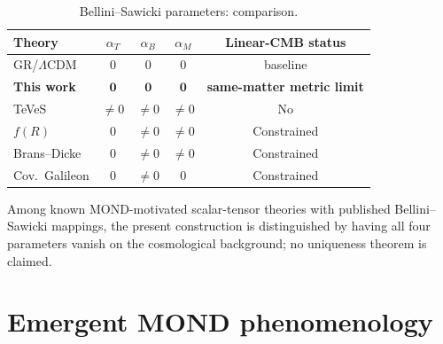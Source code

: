 \documentclass[aps,prd,onecolumn,superscriptaddress,nofootinbib,showpacs,12pt]{revtex4-2}
\begin{document}
\begin{table}[ht]
\caption{Bellini--Sawicki parameters: comparison.
\label{tab:cmb}}
\begin{ruledtabular}
\begin{tabular}{lcccc}
Theory & $\alpha_{T}$ & $\alpha_{B}$ & $\alpha_{M}$
  & Linear-CMB status \\
\hline
GR/$\Lambda$CDM & $0$ & $0$ & $0$ & baseline \\
\textbf{This work} & $\mathbf{0}$ & $\mathbf{0}$
  & $\mathbf{0}$ & \textbf{same-matter metric limit} \\
TeVeS & $\neq 0$ & $\neq 0$ & $\neq 0$ & No \\
$f(R)$ & $0$ & $\neq 0$ & $\neq 0$ & Constrained \\
Brans--Dicke & $0$ & $\neq 0$ & $\neq 0$ & Constrained \\
Cov.\ Galileon & $0$ & $\neq 0$ & $0$ & Constrained \\
\end{tabular}
\end{ruledtabular}
\end{table}

Among known MOND-motivated scalar-tensor theories with
published Bellini--Sawicki mappings, the present
construction is distinguished by having all four
parameters vanish on the cosmological background; no
uniqueness theorem is claimed.

\section{Emergent MOND phenomenology}\label{sec:mond}
\end{document}
